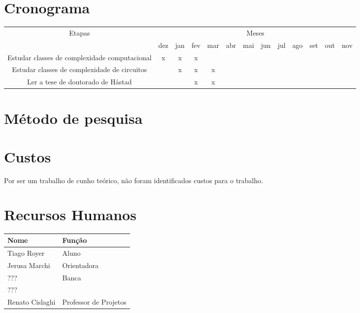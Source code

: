 \documentclass[12pt]{article}
\begin{document}
\section{Cronograma}

    \begin{tabular}{|c|c|c|c|c|c|c|c|c|c|c|c|c|}
        \hline
        \multirow{2}{*}{Etapas} & \multicolumn{12}{|c|}{Meses}\\ \cline{2-13}
                        & dez & jan & fev & mar & abr & mai & jun & jul & ago & set & out & nov \\ \hline
        Estudar classes
        de complexidade
        computacional   &  x  &  x  &  x  &     &     &     &     &     &     &     &     &     \\ \hline
        Estudar classes
        de complexidade
        de circuitos    &     &  x  &  x  &  x  &     &     &     &     &     &     &     &     \\ \hline
        Ler a tese de
        doutorado de
        Håstad          &     &     &  x  &  x  &     &     &     &     &     &     &     &     \\ \hline

    \end{tabular}

\section{Método de pesquisa}
    \blindtext[3]

\section{Custos}
    Por ser um trabalho de cunho teórico, não foram identificados custos para o trabalho.

\section{Recursos Humanos}
    \begin{tabular}{l l}
        \hline
        Nome            & Função \\
        \hline
        Tiago Royer     & Aluno \\
        Jerusa Marchi   & Orientadora \\
        ???             & \multirow{2}{*}{Banca} \\
        ???             & \\
        Renato Cislaghi & Professor de Projetos \\
        \hline
    \end{tabular}
\end{document}
